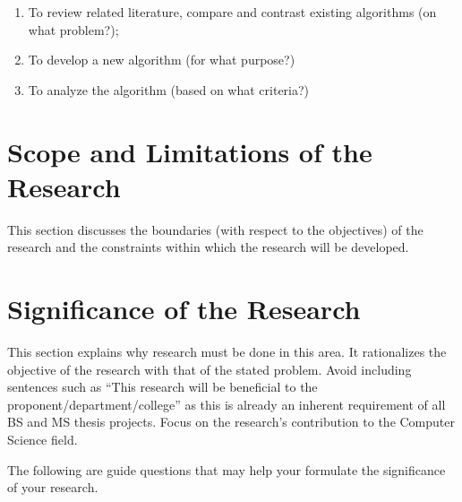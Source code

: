 %
%

\begin{enumerate}
   \item To review related literature, compare and contrast existing algorithms (on what problem?);
   \item To develop a new algorithm (for what purpose?)
   \item To analyze the algorithm (based on what criteria?)
\end{enumerate}


\section{Scope and Limitations of the Research}
\label{sec:scopelimitations}

This section discusses the boundaries (with respect to the objectives) of the research and the constraints within 
which the research will be developed.

\begin{comment}

%
%
Generally, one paragraph should be allotted for each of your research objectives.

Each paragraph contains a brief overview of the concept/theory and the purpose of doing the associated objective.

Each paragraph also includes a description of the scope/limitation of your study.

* Please refer to the slides for examples.

\end{comment}


\section{Significance of the Research}
\label{sec:significance}

This section explains why research must be done in this area.  It rationalizes the objective of the research with that of the stated problem. 
Avoid including sentences such as ``This research will be beneficial to the proponent/department/college'' as this is already an inherent
requirement of all BS and MS thesis projects.  Focus on the research's contribution to the Computer Science field.

The following are guide questions that may help your formulate the significance of your research. 


